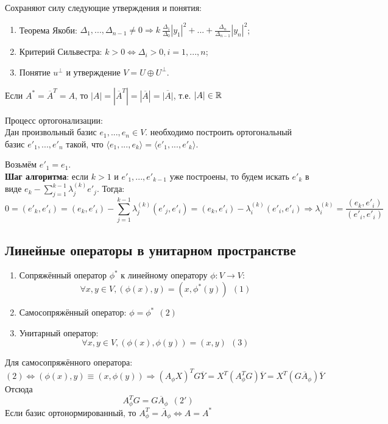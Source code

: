 Сохраняют силу следующие утверждения и понятия:
\begin{enumerate}
    \item Теорема Якоби: $\Delta_1,...,\Delta_{n-1} \neq 0 \Longrightarrow k ~ \frac{\Delta_1}{\Delta_0}|y_1|^2 + ... + \frac{\Delta_n}{\Delta_{n-1}}|y_n|^2$;
    \item Критерий Сильвестра: $k > 0 \Longleftrightarrow \Delta_i > 0, i = 1,...,n$;
    \item Понятие $u^\perp$ и утверждение $V = U \oplus U^\perp$.
\end{enumerate}
\begin{remark}
    Если $A^* = \overline{A}^T = A$, то $|A| = |\overline{A}^T| = |\overline{A}| = \overline{|A|}$, т.е. $|A| \in \mathbb{R}$
\end{remark}
\begin{algorithm} Процесс ортогонализации:\\
    Дан произвольный базис $e_1,...,e_n \in V$. необходимо построить ортогональный базис $e'_1,...,e'_n$ такой, что $\langle e_1,...,e_k \rangle = \langle e'_1,...,e'_k \rangle$.
\end{algorithm}
Возьмём $e'_1 = e_1$.\\
\textbf{Шаг алгоритма}: если $k > 1$ и $e'_1,...,e'_{k-1}$ уже построены, то будем искать $e'_k$ в виде $e_k - \sum \limits_{j=1}^{k-1} \lambda_j^{(k)}e'_j$. Тогда:
$$0 = (e'_k, e'_i) = (e_k, e'_i) - \sum \limits_{j=1}^{k-1} \lambda_j^{(k)}(e'_j, e'_i) = (e_k, e'_i) - \lambda_i^{(k)}(e'_i, e'_i) \Longrightarrow \lambda_i^{(k)} = \frac{(e_k, e'_i)}{(e'_i, e'_i)}$$ 
\subsection{Линейные операторы в унитарном пространстве}
\begin{enumerate}
    \item Сопряжённый оператор $\phi^*$ к линейному оператору $\phi: V \rightarrow V$:
    $$\forall x,y \in V, (\phi(x), y) = (x, \phi^*(y)) \ \ (1)$$
    \item Самосопряжённый оператор: $\phi = \phi^* \ \ (2)$
    \item Унитарный оператор:
    $$\forall x,y \in V, (\phi(x), \phi(y)) = (x, y) \ \ (3)$$
\end{enumerate}

Для самосопряжённого оператора:
$$(2) \Longleftrightarrow (\phi(x), y) \equiv (x, \phi(y)) \Longrightarrow (A_\phi X)^TG\overline{Y} = X^T(A_\phi^TG)\overline{Y} = X^T(G\overline{A}_\phi)\overline{Y}$$
Отсюда
$$A_\phi^TG = G\overline{A}_\phi \ \ (2')$$
Если базис ортонормированный, то $A_\phi^T = \overline{A}_\phi \Longleftrightarrow A = A^*$

